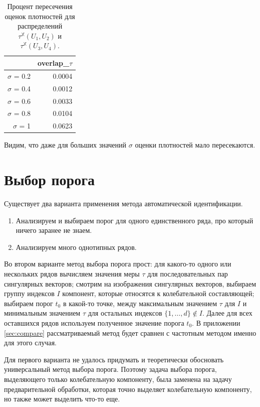 \documentclass[specialist,
               substylefile = spbu.rtx,
               subf,href,colorlinks=true, 12pt]{disser}
\begin{document}
\begin{table}[hhh!]
\caption{Процент пересечения оценок плотностей для распределений $\tau^{\mathbb{X}}(U_1, U_2)$ и $\tau^{\mathbb{X}}(U_3, U_4)$.}
\centering
\begin{tabular}{rr}
  \hline
 & overlap\_$\tau$ \\
  \hline
$\sigma$ = 0.2 & 0.0004 \\ 
  $\sigma$ = 0.4 & 0.0012 \\ 
  $\sigma$ = 0.6 & 0.0033 \\ 
  $\sigma$ = 0.8 & 0.0104 \\ 
  $\sigma$ = 1 & 0.0623 \\ 
   \hline
\end{tabular}
\label{tab:model_dist_tau1_overlap_sig_noise_notint}
\end{table}

Видим, что даже для больших значений $\sigma$ оценки плотностей мало пересекаются.

\section{Выбор порога}
\label{sec:treshold_selection}

Существует два варианта применения метода автоматической идентификации.

\begin{enumerate}
\item Анализируем и выбираем порог для одного единственного ряда, про который ничего заранее не знаем.
\item Анализируем много однотипных рядов.
\end{enumerate}

Во втором варианте метод выбора порога прост:
для какого-то одного или нескольких рядов вычисляем значения меры $\tau$ для последовательных пар сингулярных векторов;
смотрим на изображения сингулярных векторов, выбираем группу индексов $I$ компонент, которые относятся к колебательной составляющей; выбираем порог $t_0$ в какой-то точке, между максимальным значением $\tau$ для $I$ и минимальным значением $\tau$ для остальных индексов $\{1,\ldots,d\} \not \in I$. Далее для всех оставшихся рядов используем полученное значение порога $t_0$. В приложении \ref{sec:compare} рассматриваемый метод будет сравнен с частотным методом именно для этого случая. 

Для первого варианта не удалось придумать и теоретически обосновать универсальный метод выбора порога. Поэтому задача выбора порога, выделяющего только колебательную компоненту, была заменена на задачу предварительной обработки, которая точно выделяет колебательную компоненту, но также может выделить что-то еще.
\end{document}
